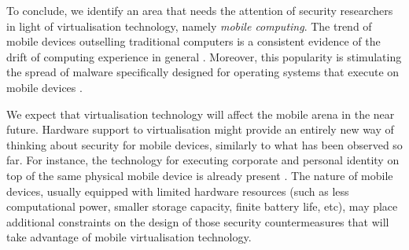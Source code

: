 

To conclude, we identify an area that needs the attention of security researchers in light of virtualisation technology, namely \emph{mobile computing}. The trend of mobile devices outselling traditional computers is a consistent evidence of the drift of computing experience in general \cite{mobilemagic, oulasvirta:habits, 6072199}. Moreover, this popularity is stimulating the spread of malware specifically designed for operating systems that execute on  mobile devices \cite{mobilemalware, mobilemalware2, androidmalware, androidmalware2, iosmalware}.
  
We expect that virtualisation technology will affect the mobile arena in the near future. Hardware support to virtualisation might provide an entirely new way of thinking about security for mobile devices, similarly to what has been observed so far.
For instance, the technology for executing corporate and personal identity on top of the same physical mobile device is already present \cite{mobilevirt}. 
The nature of mobile devices, usually equipped with limited hardware resources (such as less computational power, smaller storage capacity, finite  battery life, etc), may place additional constraints on the design of those security countermeasures that will take advantage of mobile virtualisation technology. 



